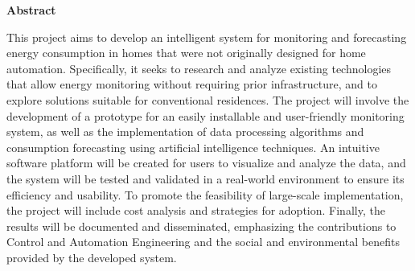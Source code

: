 
\begin{center}
\huge{{\bf Abstract}}
\vspace{2cm}
\end{center}

This project aims to develop an intelligent system for monitoring and forecasting energy consumption in homes that were not originally designed for home automation. Specifically, it seeks to research and analyze existing technologies that allow energy monitoring without requiring prior infrastructure, and to explore solutions suitable for conventional residences. The project will involve the development of a prototype for an easily installable and user-friendly monitoring system, as well as the implementation of data processing algorithms and consumption forecasting using artificial intelligence techniques. An intuitive software platform will be created for users to visualize and analyze the data, and the system will be tested and validated in a real-world environment to ensure its efficiency and usability. To promote the feasibility of large-scale implementation, the project will include cost analysis and strategies for adoption. Finally, the results will be documented and disseminated, emphasizing the contributions to Control and Automation Engineering and the social and environmental benefits provided by the developed system. 

\clearpage
\thispagestyle{empty}
\cleardoublepage

